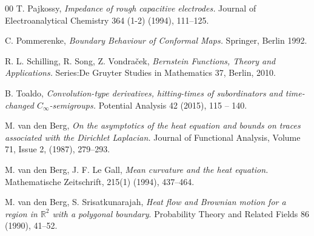 \documentclass[[11pt,a4paper,reqno]{article}
\newcommand{\R}{{\mathbb R}}
\numberwithin{equation}{section}
\begin{document}
{\begin{thebibliography}{00}
  {\sc T. Pajkossy},   \emph{
Impedance of rough capacitive electrodes.} Journal of Electroanalytical Chemistry  364 (1-2) (1994),  111--125.


    {\sc  C. Pommerenke,}  \emph{Boundary Behaviour of Conformal Maps.} Springer, Berlin 1992.


{\sc R. L. Schilling, R. Song, Z. Vondra\v{c}ek,}
 \emph{Bernstein Functions, Theory and Applications.}
{Series:De Gruyter Studies in Mathematics 37, Berlin, 2010.}

{\sc B. Toaldo,}
 \emph{Convolution-type derivatives, hitting-times of subordinators and
time-changed $C_\infty$-semigroups.}
{Potential Analysis 42 (2015), 115 -- 140.}

 {\sc M. van den Berg,}
 \emph{
On the asymptotics of the heat equation and bounds on traces associated with the Dirichlet Laplacian.}
Journal of Functional Analysis,
Volume 71, Issue 2,
(1987), 279--293.

 {\sc M. van den Berg, J. F. Le Gall,} \emph{ Mean curvature and the heat equation.} Mathematische
Zeitschrift, 215(1) (1994), 437--464.


  {\sc  M. van den Berg,  S. Srisatkunarajah,} \emph{Heat flow and Brownian motion for a region in $\R^2$
with a polygonal boundary}. Probability Theory and Related Fields 86 (1990), 41--52.

\end{thebibliography}
}
\end{document}

